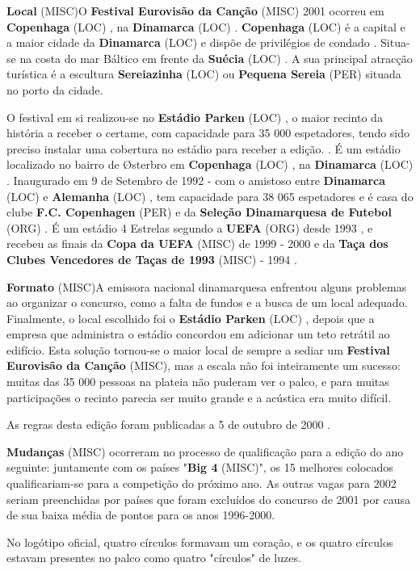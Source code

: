 \documentclass[12pt,a4paper]{article}
\begin{document}
\textbf{Local} (MISC)O \textbf{Festival Eurovisão da Canção} (MISC) 2001 ocorreu em \textbf{Copenhaga} (LOC) , na \textbf{Dinamarca} (LOC) . \textbf{Copenhaga} (LOC) é a capital e a maior cidade da \textbf{Dinamarca} (LOC) e dispõe de privilégios de condado . Situa-se na costa do mar Báltico em frente da \textbf{Suécia} (LOC) . A sua principal atracção turística é a escultura \textbf{Sereiazinha} (LOC) ou \textbf{Pequena Sereia} (PER) situada no porto da cidade.

O festival em si realizou-se no \textbf{Estádio Parken} (LOC) , o maior recinto da história a receber o certame, com capacidade para 35 000 espetadores, tendo sido preciso instalar uma cobertura no estádio para receber a edição. . É um estádio localizado no bairro de Østerbro em \textbf{Copenhaga} (LOC) , na \textbf{Dinamarca} (LOC) . Inaugurado em 9 de Setembro de 1992 - com o amistoso entre \textbf{Dinamarca} (LOC) e \textbf{Alemanha} (LOC) , tem capacidade para 38 065 espetadores e é casa do clube \textbf{F.C. Copenhagen} (PER) e da \textbf{Seleção Dinamarquesa de Futebol} (ORG) . É um estádio 4 Estrelas segundo a \textbf{UEFA} (ORG) desde 1993 , e recebeu as finais da \textbf{Copa da UEFA} (MISC) de 1999 - 2000 e da \textbf{Taça dos Clubes Vencedores de Taças de 1993} (MISC) - 1994 .



\textbf{Formato} (MISC)A emissora nacional dinamarquesa enfrentou alguns problemas ao organizar o concurso, como a falta de fundos e a busca de um local adequado. Finalmente, o local escolhido foi o \textbf{Estádio Parken} (LOC) , depois que a empresa que administra o estádio concordou em adicionar um teto retrátil ao edifício. Esta solução tornou-se o maior local de sempre a sediar um \textbf{Festival Eurovisão da Canção} (MISC), mas a escala não foi inteiramente um sucesso: muitas das 35 000 pessoas na plateia não puderam ver o palco, e para muitas participações o recinto parecia ser muito grande e a acústica era muito difícil.

As regras desta edição foram publicadas a 5 de outubro de 2000 .

\textbf{Mudanças} (MISC) ocorreram no processo de qualificação para a edição do ano seguinte: juntamente com os países "\textbf{Big 4} (MISC)", os 15 melhores colocados qualificariam-se para a competição do próximo ano. As outras vagas para 2002 seriam preenchidas por países que foram excluídos do concurso de 2001 por causa de sua baixa média de pontos para os anos 1996-2000.

No logótipo oficial, quatro círculos formavam um coração, e os quatro círculos estavam presentes no palco como quatro "círculos" de luzes.
\end{document}
